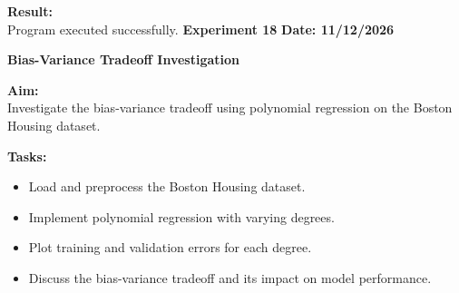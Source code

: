 \documentclass[12pt, a4paper]{article}
\begin{document}
\vspace{\baselineskip}

\noindent \textbf{Result:}\\
Program executed successfully.
\newpage
\noindent \textbf{Experiment 18} \hfill \textbf{Date: 11/12/2026}\\
\begin{center} \Large \textbf{Bias-Variance Tradeoff Investigation} \end{center}
\textbf{Aim:}\\
Investigate the bias-variance tradeoff using polynomial regression on the Boston Housing dataset.

\vspace{\baselineskip}
\noindent \textbf{Tasks:}\\
\vspace{-0.5\baselineskip}
\begin{itemize}[nosep]
    \item Load and preprocess the Boston Housing dataset.
    \item Implement polynomial regression with varying degrees.
    \item Plot training and validation errors for each degree.
    \item Discuss the bias-variance tradeoff and its impact on model performance.
\end{itemize}
\end{document}
